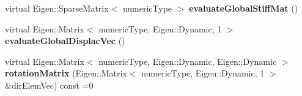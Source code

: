 \begin{DoxyCompactItemize}
virtual Eigen\+::\+Sparse\+Matrix$<$ numeric\+Type $>$ {\bfseries evaluate\+Global\+Stiff\+Mat} ()
\item 
\mbox{\label{classbase_structural_analysis_class_a8ae8b924f3c1c20f131db1570544cb90}} 
virtual Eigen\+::\+Matrix$<$ numeric\+Type, Eigen\+::\+Dynamic, 1 $>$ {\bfseries evaluate\+Global\+Displac\+Vec} ()
\item 
\mbox{\label{classbase_structural_analysis_class_a110e4cdc86a9e8611dade6db8751f02d}} 
virtual Eigen\+::\+Matrix$<$ numeric\+Type, Eigen\+::\+Dynamic, Eigen\+::\+Dynamic $>$ {\bfseries rotation\+Matrix} (Eigen\+::\+Matrix$<$ numeric\+Type, Eigen\+::\+Dynamic, 1 $>$ \&dir\+Elem\+Vec) const =0
\end{DoxyCompactItemize}
